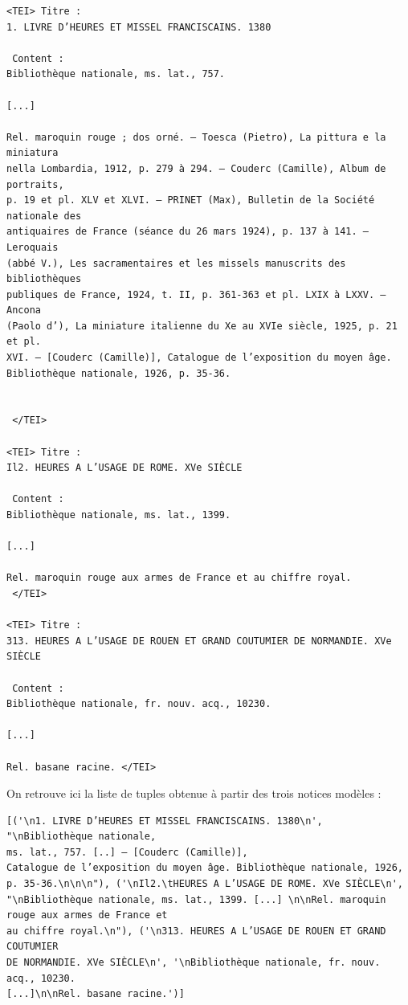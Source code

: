 \documentclass[a4paper,12pt,twoside]{book}
\begin{document}
	\begin{verbatim}
<TEI> Titre : 
1. LIVRE D’HEURES ET MISSEL FRANCISCAINS. 1380
 
 Content : 
Bibliothèque nationale, ms. lat., 757.

[...]

Rel. maroquin rouge ; dos orné. — Toesca (Pietro), La pittura e la miniatura 
nella Lombardia, 1912, p. 279 à 294. — Couderc (Camille), Album de portraits, 
p. 19 et pl. XLV et XLVI. — PRINET (Max), Bulletin de la Société nationale des
antiquaires de France (séance du 26 mars 1924), p. 137 à 141. — Leroquais 
(abbé V.), Les sacramentaires et les missels manuscrits des bibliothèques 
publiques de France, 1924, t. II, p. 361-363 et pl. LXIX à LXXV. — Ancona 
(Paolo d’), La miniature italienne du Xe au XVIe siècle, 1925, p. 21 et pl.
XVI. — [Couderc (Camille)], Catalogue de l’exposition du moyen âge.
Bibliothèque nationale, 1926, p. 35-36.


 </TEI> 

<TEI> Titre : 
Il2. HEURES A L’USAGE DE ROME. XVe SIÈCLE
 
 Content : 
Bibliothèque nationale, ms. lat., 1399.

[...]

Rel. maroquin rouge aux armes de France et au chiffre royal.
 </TEI> 

<TEI> Titre : 
313. HEURES A L’USAGE DE ROUEN ET GRAND COUTUMIER DE NORMANDIE. XVe SIÈCLE 
 
 Content : 
Bibliothèque nationale, fr. nouv. acq., 10230.

[...]

Rel. basane racine. </TEI> 
	\end{verbatim}
	
On retrouve ici la liste de tuples obtenue à partir des trois notices modèles :

\begin{verbatim}
[('\n1. LIVRE D’HEURES ET MISSEL FRANCISCAINS. 1380\n', "\nBibliothèque nationale, 
ms. lat., 757. [..] — [Couderc (Camille)], 
Catalogue de l’exposition du moyen âge. Bibliothèque nationale, 1926,
p. 35-36.\n\n\n"), ('\nIl2.\tHEURES A L’USAGE DE ROME. XVe SIÈCLE\n', 
"\nBibliothèque nationale, ms. lat., 1399. [...] \n\nRel. maroquin rouge aux armes de France et 
au chiffre royal.\n"), ('\n313. HEURES A L’USAGE DE ROUEN ET GRAND COUTUMIER 
DE NORMANDIE. XVe SIÈCLE\n', '\nBibliothèque nationale, fr. nouv. acq., 10230.
[...]\n\nRel. basane racine.')]
\end{verbatim}
\end{document}
